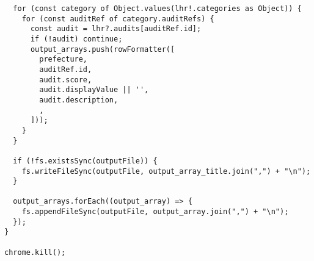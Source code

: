 \begin{lstlisting}
  for (const category of Object.values(lhr!.categories as Object)) {
    for (const auditRef of category.auditRefs) {
      const audit = lhr?.audits[auditRef.id];
      if (!audit) continue;
      output_arrays.push(rowFormatter([
        prefecture,
        auditRef.id,
        audit.score,
        audit.displayValue || '',
        audit.description,
        ,
      ]));
    }
  }

  if (!fs.existsSync(outputFile)) {
    fs.writeFileSync(outputFile, output_array_title.join(",") + "\n");
  }

  output_arrays.forEach((output_array) => {
    fs.appendFileSync(outputFile, output_array.join(",") + "\n");
  });
}

chrome.kill();
\end{lstlisting}